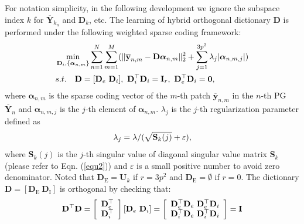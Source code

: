 \documentclass[10pt,twocolumn,letterpaper]{article}
\begin{document}
For notation simplicity, in the following development we ignore the subspace index $k$ for $\mathbf{\overline{Y}}_{k_{n}}$ and $\mathbf{D}_{k}$, etc. The learning of hybrid orthogonal dictionary $\mathbf{D}$ is performed under the following weighted sparse coding
framework:
\vspace{-2mm}
\begin{equation}\label{equ4}\vspace{-3mm}
\begin{split}
&\min_{\mathbf{D}_{i},\{\bm{\alpha}_{n,m}\}}
\sum_{n=1}^{N}\sum_{m=1}^{M}(\|\mathbf{\overline{y}}_{n,m}-\mathbf{D}\bm{\alpha}_{n,m}\|_{2}^{2}+\sum_{j=1}^{3p^{2}}\lambda_{j}|\bm{\alpha}_{n,m,j}|)
\\
&
s.t.
\quad
\mathbf{D}=[\mathbf{D}_{e}\ \mathbf{D}_{i}],\ \mathbf{D}_{i}^{\top}\mathbf{D}_{i} = \mathbf{I}_{r},\ \mathbf{D}_{e}^{\top}\mathbf{D}_{i} = \mathbf{0},
\end{split}
\end{equation}
where $\bm{\alpha}_{n,m}$ is the sparse coding vector of the $m$-th patch $\mathbf{\overline{y}}_{n,m}$ in the $n$-th PG $\mathbf{\overline{Y}}_{n}$ and $\bm{\alpha}_{n,m,j}$ is the $j$-th element of $\bm{\alpha}_{n,m}$. $\lambda_{j}$ is the $j$-th regularization parameter defined as
\vspace{-1mm}
\begin{equation}\label{equ5}\vspace{-1mm}
\lambda_{j} = \lambda/(\sqrt{\mathbf{S}_{k}(j)}+\varepsilon),
\end{equation}
where $\mathbf{S}_{k}(j)$ is the $j$-th singular value of diagonal singular value matrix $\mathbf{S}_{k}$ (please refer to Eqn. (\ref{equ2})) and $\varepsilon$ is a small positive number to avoid zero denominator. Noted that $\mathbf{D}_{\text{E}}=\mathbf{U}_{k}$ if $r=3p^{2}$ and $\mathbf{D}_{\text{E}}=\emptyset$ if $r=0$. The dictionary $\mathbf{D} = [\mathbf{D}_{\text{E}}\ \mathbf{D}_{\text{I}}]$ is orthogonal by checking that:
\vspace{-2mm}
\begin{equation}\label{equ6}\vspace{-1mm}
\mathbf{D}^{\top}\mathbf{D} = 
\left[\begin{array}{c}
\mathbf{D}_{e}^{\top}
\\
\mathbf{D}_{i}^{\top}
\end{array}\right]
[\mathbf{D}_{e}\ \mathbf{D}_{i}]
=
\left[\begin{array}{cc}
\mathbf{D}_{e}^{\top}\mathbf{D}_{e}\ \mathbf{D}_{e}^{\top}\mathbf{D}_{i}
\\
\mathbf{D}_{i}^{\top}\mathbf{D}_{e}\ \mathbf{D}_{i}^{\top}\mathbf{D}_{i}
\end{array}\right]
=
\mathbf{I}
\end{equation}
\end{document}
